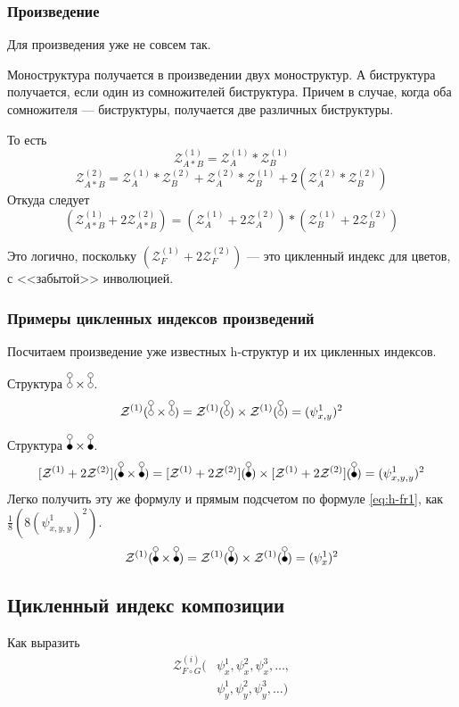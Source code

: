 \subsubsection{Произведение}
Для произведения уже не совсем так. 
\begin{statement}
Моноструктура получается
в произведении двух моноструктур. А биструктура получается, если один из
сомножителей биструктура. Причем в случае, когда оба сомножителя ---
биструктуры, получается две различных биструктуры. 
\end{statement}
То есть
$$
\mathcal Z_{A * B}^{(1)} = \mathcal Z_A^{(1)} * \mathcal Z_B^{(1)}
$$
$$
\mathcal Z_{A * B}^{(2)} = 
\mathcal Z_A^{(1)} * \mathcal Z_B^{(2)} + 
\mathcal Z_A^{(2)} * \mathcal Z_B^{(1)} +
2 (\mathcal Z_A^{(2)} * \mathcal Z_B^{(2)})
$$
Откуда следует
$$
(\mathcal Z_{A * B}^{(1)} + 2\mathcal Z_{A * B}^{(2)}) = 
(\mathcal Z_A^{(1)} + 2\mathcal Z_A^{(2)}) * 
(\mathcal Z_B^{(1)} + 2\mathcal Z_B^{(2)})
$$

\begin{remark}
Это логично, поскольку $(\mathcal Z_F^{(1)} + 2\mathcal Z_F^{(2)})$ --- это
цикленный индекс для цветов, с <<забытой>> инволюцией.
\end{remark}

\subsubsection{Примеры цикленных индексов произведений}
Посчитаем произведение уже известных h-структур и их цикленных индексов.

\begin{example}
Структура $\dA \times \dA$.
$$
\mathcal Z^{(1)}(\dA \times \dA) = \mathcal Z^{(1)}(\dA) \times \mathcal
Z^{(1)}(\dA) = (\psi_{x, y}^1)^2
$$
\end{example}
\begin{example}
Структура $\dB \times \dB$.
$$
\Zfull(\dB \times \dB) = \Zfull(\dB) \times \Zfull(\dB) =(\psi_{x, y, y}^1)^2
$$
Легко получить эту же формулу и прямым подсчетом по формуле \ref{eq:h-fr1}, как
$\frac{1}{8}(8(\psi_{x, y, y}^1)^2)$.
$$
\mathcal Z^{(1)}(\dB \times \dB) = \mathcal Z^{(1)}(\dB) \times \mathcal
Z^{(1)}(\dB) =(\psi_{x}^1)^2
$$
\end{example}

\subsection{Цикленный индекс композиции}
\begin{problem}
Как выразить
\begin{equation*}
\begin{split}
\mathcal Z^{(i)}_{F \circ G} (&\psi_x^1, \psi_x^2, \psi_x^3, \dots, \\
						&\psi_y^1, \psi_y^2, \psi_y^3, \dots)
\end{split}
\end{equation*}
\end{problem}

